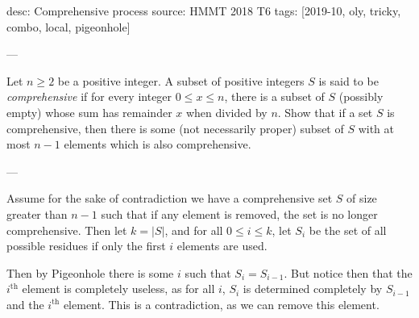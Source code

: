desc: Comprehensive process
source: HMMT 2018 T6
tags: [2019-10, oly, tricky, combo, local, pigeonhole]

---

Let $n\ge2$ be a positive integer. A subset of positive integers $S$ is said to be \emph{comprehensive} if for every integer $0\le x\le n$, there is a subset of $S$ (possibly empty) whose sum has remainder $x$ when divided by $n$. Show that if a set $S$ is comprehensive, then there is some (not necessarily proper) subset of $S$ with at most $n-1$ elements which is also comprehensive.

---

Assume for the sake of contradiction we have a comprehensive set $S$ of size greater than $n-1$ such that if any element is removed, the set is no longer comprehensive. Then let $k=|S|$, and for all $0\le i\le k$, let $S_i$ be the set of all possible residues if only the first $i$ elements are used.

Then by Pigeonhole there is some $i$ such that $S_i=S_{i-1}$. But notice then that the $i^\text{th}$ element is completely useless, as for all $i$, $S_i$ is determined completely by $S_{i-1}$ and the $i^\text{th}$ element. This is a contradiction, as we can remove this element.

